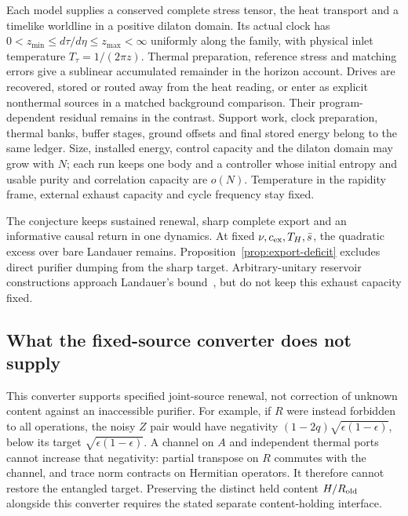 \begin{conjecture}
Each model supplies a conserved complete stress tensor, the heat transport
and a timelike worldline in a positive dilaton domain. Its actual clock
has $0<z_{\min}\le d\tau/d\eta\le z_{\max}<\infty$ uniformly along the
family, with physical inlet temperature $T_\tau=1/(2\pi z)$.
Thermal preparation, reference stress and matching errors give a
sublinear accumulated remainder in the horizon account. Drives are
recovered, stored or routed away from the heat reading, or enter as
explicit nonthermal sources in a matched background comparison. Their
program-dependent residual remains in the contrast. Support work,
clock preparation, thermal banks, buffer stages, ground offsets and
final stored energy belong to the same ledger. Size, installed energy,
control capacity and the dilaton domain may grow with $N$; each run
keeps one body and a controller whose initial entropy and usable purity
and correlation capacity are $o(N)$.
Temperature in the rapidity frame, external exhaust capacity and
cycle frequency stay fixed.
\end{conjecture}

The conjecture keeps sustained renewal, sharp complete export and an
informative causal return in one dynamics. At fixed
$\nu,c_{\rm ex},T_H,\bar s$, the quadratic excess over bare Landauer
remains. Proposition~\ref{prop:export-deficit} excludes direct purifier
dumping from the sharp target. Arbitrary-unitary reservoir constructions
approach Landauer's bound~\cite[Section~6]{ReebWolf2014}, but do not
keep this exhaust capacity fixed.


\subsection{What the fixed-source converter does not supply}

This converter supports specified joint-source renewal, not correction
of unknown content against an inaccessible purifier. For example, if
$R$ were instead forbidden to all operations, the noisy $Z$ pair would
have negativity $(1-2q)\sqrt{\epsilon(1-\epsilon)}$, below its target
$\sqrt{\epsilon(1-\epsilon)}$. A channel on $A$ and independent thermal
ports cannot increase that negativity: partial transpose on $R$
commutes with the channel, and trace norm contracts on Hermitian
operators. It therefore cannot restore the entangled target.
Preserving the distinct held content $H/R_{\rm old}$ alongside this
converter requires the stated separate content-holding interface.

